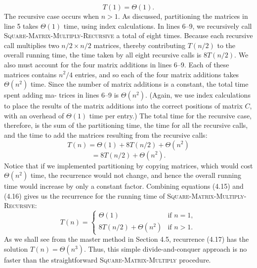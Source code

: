 \documentclass{report}
\begin{document}
        \[
            T(1) = \Theta(1). \tag{4.15}
        \]
        \bigbreak \noindent 
        The recursive case occurs when $n > 1$. As discussed, partitioning the matrices in
        line 5 takes $\Theta(1)$ time, using index calculations. In lines 6–9, we recursively call
        \textsc{Square-Matrix-Multiply-Recursive} a total of eight times. Because each
        recursive call multiplies two $n/2 \times n/2$ matrices, thereby contributing $T(n/2)$ to
        the overall running time, the time taken by all eight recursive calls is $8T(n/2)$. We
        also must account for the four matrix additions in lines 6–9. Each of these matrices
        contains $n^2/4$ entries, and so each of the four matrix additions takes $\Theta(n^2)$ time.
        Since the number of matrix additions is a constant, the total time spent adding ma-
        \bigbreak \noindent 
        trices in lines 6–9 is $\Theta(n^2)$. (Again, we use index calculations to place the results
        of the matrix additions into the correct positions of matrix $C$, with an overhead
        of $\Theta(1)$ time per entry.) The total time for the recursive case, therefore, is the sum
        of the partitioning time, the time for all the recursive calls, and the time to add the
        matrices resulting from the recursive calls:
        \[
            T(n) = \Theta(1) + 8T(n/2) + \Theta(n^2)
        \]
        \[
            = 8T(n/2) + \Theta(n^2). \tag{4.16}
        \]
        Notice that if we implemented partitioning by copying matrices, which would cost
        $\Theta(n^2)$ time, the recurrence would not change, and hence the overall running time
        would increase by only a constant factor.
        \bigbreak \noindent 
        Combining equations (4.15) and (4.16) gives us the recurrence for the running
        time of \textsc{Square-Matrix-Multiply-Recursive}:
        \[
            T(n) =
            \begin{cases}
                \Theta(1) & \text{if } n = 1, \\
                8T(n/2) + \Theta(n^2) & \text{if } n > 1.
            \end{cases} \tag{4.17}
        \]
        As we shall see from the master method in Section 4.5, recurrence (4.17) has the
        solution $T(n) = \Theta(n^3)$. Thus, this simple divide-and-conquer approach is no
        faster than the straightforward \textsc{Square-Matrix-Multiply} procedure.
        \bigbreak \noindent 
\end{document}
